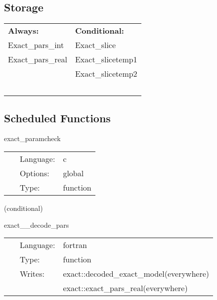 \subsection*{Storage}

\hspace{5mm}

 \begin{tabular*}{160mm}{ll} 

{\bf Always:}& {\bf Conditional:} \\ 
 Exact\_pars\_int &  Exact\_slice\\ 
 Exact\_pars\_real &  Exact\_slicetemp1\\ 
~ &  Exact\_slicetemp2\\ 
~ & ~\\ 
\end{tabular*} 


\subsection*{Scheduled Functions}
\vspace{5mm}


\hspace{5mm} exact\_paramcheck 

\hspace{5mm}{\it do consistency checks on our parameters } 


\hspace{5mm}

 \begin{tabular*}{160mm}{cll} 
~ & Language:  & c \\ 
~ & Options:  & global \\ 
~ & Type:  & function \\ 
\end{tabular*} 


\vspace{5mm}

   (conditional) 

\hspace{5mm} exact\_\_decode\_pars 

\hspace{5mm}{\it decode/copy thorn exact parameters into grid scalars } 


\hspace{5mm}

 \begin{tabular*}{160mm}{cll} 
~ & Language:  & fortran \\ 
~ & Type:  & function \\ 
~ & Writes:  & exact::decoded\_exact\_model(everywhere) \\ 
~& ~ &exact::exact\_pars\_real(everywhere)\\ 
\end{tabular*} 


